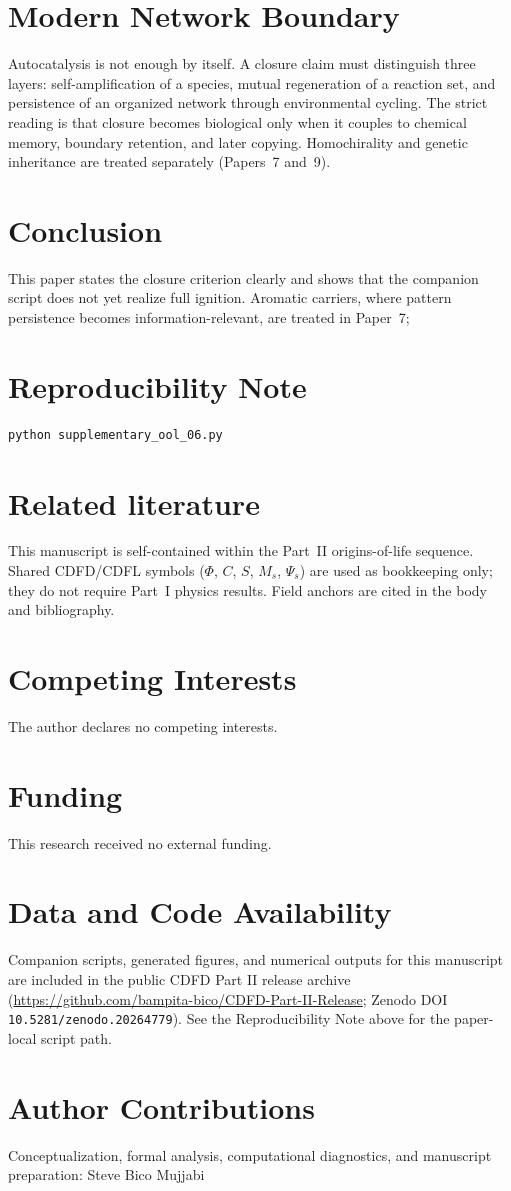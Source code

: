 \documentclass[11pt,a4paper]{article}
\begin{document}
\section{Modern Network Boundary}
Autocatalysis is not enough by itself. A closure claim must distinguish three layers: self-amplification of a species, mutual regeneration of a reaction set, and persistence of an organized network through environmental cycling. The strict reading is that closure becomes biological only when it couples to chemical memory, boundary retention, and later copying. Homochirality and genetic inheritance are treated separately (Papers~7 and~9).

\section{Conclusion}
This paper states the closure criterion clearly and shows that the companion script does not yet realize full ignition. Aromatic carriers, where pattern persistence becomes information-relevant, are treated in Paper~7;

\section{Reproducibility Note}
\begin{verbatim}
python supplementary_ool_06.py
\end{verbatim}

\section*{Related literature}
This manuscript is self-contained within the Part~II origins-of-life sequence. Shared CDFD/CDFL symbols ($\Phi$, $C$, $S$, $M_s$, $\Psi_s$) are used as bookkeeping only; they do not require Part~I physics results. Field anchors are cited in the body and bibliography.

\section*{Competing Interests}
The author declares no competing interests.

\section*{Funding}
This research received no external funding.

\section*{Data and Code Availability}
Companion scripts, generated figures, and numerical outputs for this manuscript are included in the public CDFD Part II release archive (\url{https://github.com/bampita-bico/CDFD-Part-II-Release}; Zenodo DOI \texttt{10.5281/zenodo.20264779}). See the Reproducibility Note above for the paper-local script path.

\section*{Author Contributions}
Conceptualization, formal analysis, computational diagnostics, and manuscript preparation: Steve Bico Mujjabi



\end{document}
